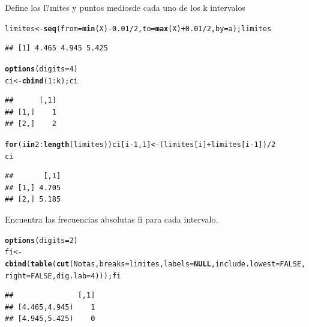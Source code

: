 \documentclass[10pt,a4paper]{article}\usepackage[]{graphicx}\usepackage[]{color}
\makeatletter
\newcommand{\hlnum}[1]{\textcolor[rgb]{0.686,0.059,0.569}{#1}}%
\newcommand{\hlopt}[1]{\textcolor[rgb]{0,0,0}{#1}}%
\newcommand{\hlstd}[1]{\textcolor[rgb]{0.345,0.345,0.345}{#1}}%
\newcommand{\hlkwa}[1]{\textcolor[rgb]{0.161,0.373,0.58}{\textbf{#1}}}%
\newcommand{\hlkwb}[1]{\textcolor[rgb]{0.69,0.353,0.396}{#1}}%
\newcommand{\hlkwc}[1]{\textcolor[rgb]{0.333,0.667,0.333}{#1}}%
\newcommand{\hlkwd}[1]{\textcolor[rgb]{0.737,0.353,0.396}{\textbf{#1}}}%
\newenvironment{kframe}{%
 \def\at@end@of@kframe{}%
 \ifinner\ifhmode%
  \def\at@end@of@kframe{\end{minipage}}%
  \begin{minipage}{\columnwidth}%
 \fi\fi%
 \def\FrameCommand##1{\hskip\@totalleftmargin \hskip-\fboxsep
 \colorbox{shadecolor}{##1}\hskip-\fboxsep
     \hskip-\linewidth \hskip-\@totalleftmargin \hskip\columnwidth}%
 \MakeFramed {\advance\hsize-\width
   \@totalleftmargin\z@ \linewidth\hsize
   \@setminipage}}%
 {\par\unskip\endMakeFramed%
 \at@end@of@kframe}
\newenvironment{knitrout}{}{} %
\makeatother
\begin{document}
 Define los l?mites y puntos mediosde cada uno de los k intervalos 
\begin{knitrout}
\color{fgcolor}\begin{kframe}
\begin{alltt}
\hlstd{limites} \hlkwb{<-} \hlkwd{seq}\hlstd{(}\hlkwc{from}\hlstd{=}\hlkwd{min}\hlstd{(X)}\hlopt{-}\hlnum{0.01}\hlopt{/}\hlnum{2}\hlstd{,}\hlkwc{to}\hlstd{=}\hlkwd{max}\hlstd{(X)}\hlopt{+}\hlnum{0.01}\hlopt{/}\hlnum{2}\hlstd{,} \hlkwc{by}\hlstd{=a); limites}
\end{alltt}
\begin{verbatim}
## [1] 4.465 4.945 5.425
\end{verbatim}
\begin{alltt}
\hlkwd{options}\hlstd{(}\hlkwc{digits}\hlstd{=}\hlnum{4}\hlstd{)}
\hlstd{ci} \hlkwb{<-} \hlkwd{cbind}\hlstd{(}\hlnum{1}\hlopt{:}\hlstd{k); ci}
\end{alltt}
\begin{verbatim}
##      [,1]
## [1,]    1
## [2,]    2
\end{verbatim}
\begin{alltt}
\hlkwa{for}\hlstd{(i} \hlkwa{in} \hlnum{2}\hlopt{:}\hlkwd{length}\hlstd{(limites)) ci[i}\hlopt{-}\hlnum{1}\hlstd{,} \hlnum{1}\hlstd{]} \hlkwb{<-} \hlstd{(limites[i]} \hlopt{+} \hlstd{limites[i}\hlopt{-}\hlnum{1}\hlstd{])}\hlopt{/}\hlnum{2}
\hlstd{ci}
\end{alltt}
\begin{verbatim}
##       [,1]
## [1,] 4.705
## [2,] 5.185
\end{verbatim}
\end{kframe}
\end{knitrout}

 Encuentra las frecuencias absolutas fi para cada intervalo. 
\begin{knitrout}
\color{fgcolor}\begin{kframe}
\begin{alltt}
\hlkwd{options}\hlstd{(}\hlkwc{digits}\hlstd{=}\hlnum{2}\hlstd{)}
\hlstd{fi} \hlkwb{<-} \hlkwd{cbind}\hlstd{(}\hlkwd{table}\hlstd{(}\hlkwd{cut}\hlstd{(Notas,} \hlkwc{breaks} \hlstd{= limites,} \hlkwc{labels}\hlstd{=}\hlkwa{NULL}\hlstd{,} \hlkwc{include.lowest}\hlstd{=}\hlnum{FALSE}\hlstd{,}
\hlkwc{right}\hlstd{=}\hlnum{FALSE}\hlstd{,} \hlkwc{dig.lab}\hlstd{=}\hlnum{4}\hlstd{))); fi}
\end{alltt}
\begin{verbatim}
##               [,1]
## [4.465,4.945)    1
## [4.945,5.425)    0
\end{verbatim}
\end{kframe}
\end{knitrout}
\end{document}
